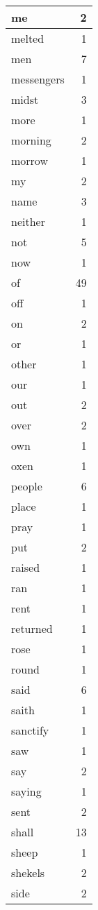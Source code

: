 \begin{center}
\begin{longtable}{l|r}
me & 2\\ \hline 
melted & 1\\ \hline 
men & 7\\ \hline 
messengers & 1\\ \hline 
midst & 3\\ \hline 
more & 1\\ \hline 
morning & 2\\ \hline 
morrow & 1\\ \hline 
my & 2\\ \hline 
name & 3\\ \hline 
neither & 1\\ \hline 
not & 5\\ \hline 
now & 1\\ \hline 
of & 49\\ \hline 
off & 1\\ \hline 
on & 2\\ \hline 
or & 1\\ \hline 
other & 1\\ \hline 
our & 1\\ \hline 
out & 2\\ \hline 
over & 2\\ \hline 
own & 1\\ \hline 
oxen & 1\\ \hline 
people & 6\\ \hline 
place & 1\\ \hline 
pray & 1\\ \hline 
put & 2\\ \hline 
raised & 1\\ \hline 
ran & 1\\ \hline 
rent & 1\\ \hline 
returned & 1\\ \hline 
rose & 1\\ \hline 
round & 1\\ \hline 
said & 6\\ \hline 
saith & 1\\ \hline 
sanctify & 1\\ \hline 
saw & 1\\ \hline 
say & 2\\ \hline 
saying & 1\\ \hline 
sent & 2\\ \hline 
shall & 13\\ \hline 
sheep & 1\\ \hline 
shekels & 2\\ \hline 
side & 2\\ \hline 

\end{longtable}
\end{center}
